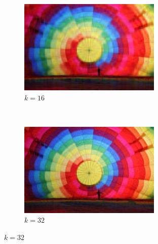 \documentclass[brazil,times]{abnt}
\begin{document}
\begin{figure}
                \begin{subfigure}[b]{0.5\textwidth}
                \centering
                \includegraphics[width=\textwidth]{imagens/balloon256-compressed-16.jpg}
                \caption{$k = 16$}
        \end{subfigure}%
        ~ %
        \begin{subfigure}[b]{0.5\textwidth}
                \centering
                \includegraphics[width=\textwidth]{imagens/balloon256-compressed-32.jpg}
                \caption{$k = 32$}
        \end{subfigure}


\end{figure}
\end{document}
